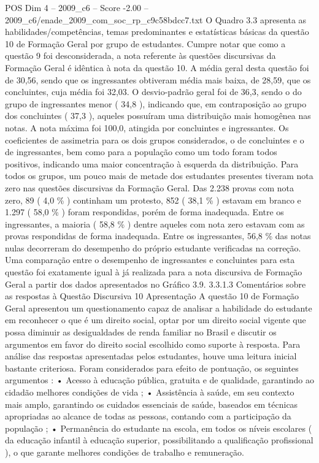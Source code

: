 \begin{textsample}{POS Dim 4 – 2009\_c6 – Score -2.00 – 2009\_c6/enade\_2009\_com\_soc\_rp\_c9c58bdcc7.txt}
O Quadro 3.3 apresenta as habilidades/competências, temas predominantes e estatísticas básicas da questão 10 de Formação Geral por grupo de estudantes.
Cumpre notar que como a questão 9 foi desconsiderada, a nota referente às questões discursivas da Formação Geral é idêntica à nota da questão 10.
A média geral desta questão foi de 30,56, sendo que os ingressantes obtiveram média mais baixa, de 28,59, que os concluintes, cuja média foi 32,03.
O desvio-padrão geral foi de 36,3, sendo o do grupo de ingressantes menor ( 34,8 ), indicando que, em contraposição ao grupo dos concluintes ( 37,3 ), aqueles possuíram uma distribuição mais homogênea nas notas.
A nota máxima foi 100,0, atingida por concluintes e ingressantes.
Os coeficientes de assimetria para os dois grupos considerados, o de concluintes e o de ingressantes, bem como para a população como um todo foram todos positivos, indicando uma maior concentração à esquerda da distribuição.
Para todos os grupos, um pouco mais de metade dos estudantes presentes tiveram nota zero nas questões discursivas da Formação Geral.
Das 2.238 provas com nota zero, 89 ( 4,0 \% ) continham um protesto, 852 ( 38,1 \% ) estavam em branco e 1.297 ( 58,0 \% ) foram respondidas, porém de forma inadequada.
Entre os ingressantes, a maioria ( 58,8 \% ) dentre aqueles com nota zero estavam com as provas respondidas de forma inadequada.
Entre os ingressantes, 56,8 \% das notas nulas decorreram do desempenho do próprio estudante verificadas na correção.
Uma comparação entre o desempenho de ingressantes e concluintes para esta questão foi exatamente igual à já realizada para a nota discursiva de Formação Geral a partir dos dados apresentados no Gráfico 3.9. 3.3.1.3 Comentários sobre as respostas à Questão Discursiva 10 Apresentação A questão 10 de Formação Geral apresentou um questionamento capaz de analisar a habilidade do estudante em reconhecer o que é um direito social, optar por um direito social vigente que possa diminuir as desigualdades de renda familiar no Brasil e discutir os argumentos em favor do direito social escolhido como suporte à resposta.
Para análise das respostas apresentadas pelos estudantes, houve uma leitura inicial bastante criteriosa.
Foram considerados para efeito de pontuação, os seguintes argumentos : • Acesso à educação pública, gratuita e de qualidade, garantindo ao cidadão melhores condições de vida ; • Assistência à saúde, em seu contexto mais amplo, garantindo os cuidados essenciais de saúde, baseados em técnicas apropriadas ao alcance de todas as pessoas, contando com a participação da população ; • Permanência do estudante na escola, em todos os níveis escolares ( da educação infantil à educação superior, possibilitando a qualificação profissional ), o que garante melhores condições de trabalho e remuneração.

\end{textsample}

